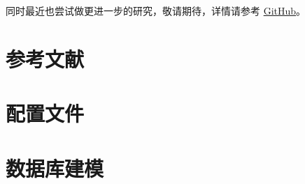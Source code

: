 同时最近也尝试做更进一步的研究，敬请期待，详情请参考 \href{https://github.com/iydon/bilibili}{GitHub}。



\clearpage
\section{参考文献}
\nocite{*}
\printbibliography[heading=none]



\clearpage
\begin{appendices}
    \section{配置文件}\label{A:config}
    \section{数据库建模}\label{A:database}
\end{appendices}
